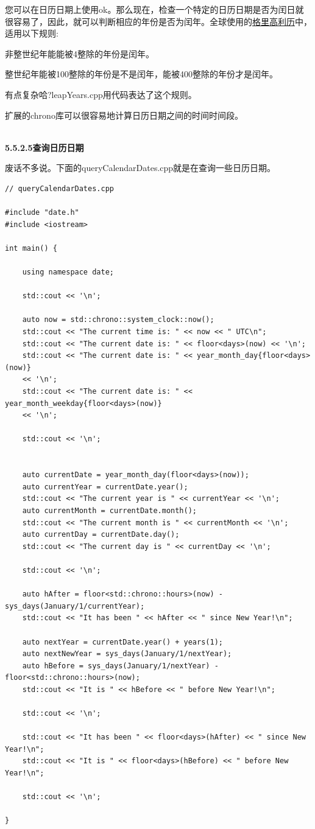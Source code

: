 您可以在日历日期上使用ok。那么现在，检查一个特定的日历日期是否为闰日就很容易了，因此，就可以判断相应的年份是否为闰年。全球使用的\href{https://en.wikipedia.org/wiki/Gregorian_calendar}{格里高利历}中，适用以下规则:

非整世纪年能能被4整除的年份是闰年。
 
整世纪年能被100整除的年份是不是闰年，能被400整除的年份才是闰年。

有点复杂哈?leapYears.cpp用代码表达了这个规则。

扩展的chrono库可以很容易地计算日历日期之间的时间时间段。

\hspace*{\fill} \\ %
\noindent
\textbf{5.5.2.5\hspace{0.2cm}查询日历日期}

废话不多说。下面的queryCalendarDates.cpp就是在查询一些日历日期。

\begin{lstlisting}[style=styleCXX]
// queryCalendarDates.cpp

#include "date.h"
#include <iostream>

int main() {
	
	using namespace date;
	
	std::cout << '\n';
	
	auto now = std::chrono::system_clock::now();
	std::cout << "The current time is: " << now << " UTC\n";
	std::cout << "The current date is: " << floor<days>(now) << '\n';
	std::cout << "The current date is: " << year_month_day{floor<days>(now)}
	<< '\n';
	std::cout << "The current date is: " << year_month_weekday{floor<days>(now)}
	<< '\n';
	
	std::cout << '\n';
	
	
	auto currentDate = year_month_day(floor<days>(now));
	auto currentYear = currentDate.year();
	std::cout << "The current year is " << currentYear << '\n';
	auto currentMonth = currentDate.month();
	std::cout << "The current month is " << currentMonth << '\n';
	auto currentDay = currentDate.day();
	std::cout << "The current day is " << currentDay << '\n';
	
	std::cout << '\n';
	
	auto hAfter = floor<std::chrono::hours>(now) - sys_days(January/1/currentYear);
	std::cout << "It has been " << hAfter << " since New Year!\n";
	
	auto nextYear = currentDate.year() + years(1);
	auto nextNewYear = sys_days(January/1/nextYear);
	auto hBefore = sys_days(January/1/nextYear) - floor<std::chrono::hours>(now);
	std::cout << "It is " << hBefore << " before New Year!\n";
	
	std::cout << '\n';
	
	std::cout << "It has been " << floor<days>(hAfter) << " since New Year!\n";
	std::cout << "It is " << floor<days>(hBefore) << " before New Year!\n";
	
	std::cout << '\n';
	
}
\end{lstlisting}

